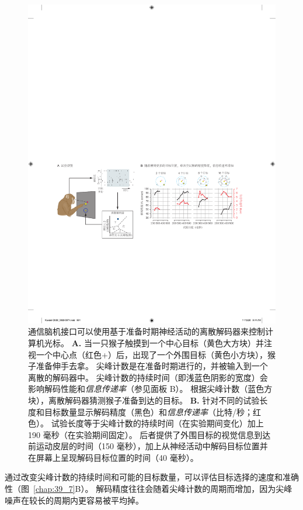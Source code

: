 \begin{figure}[htbp]
	\centering
	\includegraphics[width=1.0\linewidth]{chap39/fig_39_7}
	\caption{通信脑机接口可以使用基于准备时期神经活动的离散解码器来控制计算机光标。 
		\textbf{A.} 当一只猴子触摸到一个中心目标（黄色大方块）并注视一个中心点（红色+）后，出现了一个外围目标（黄色小方块），猴子准备伸手去拿。 
		尖峰计数是在准备时期进行的，并被输入到一个离散的解码器中。 
		尖峰计数的持续时间（即浅蓝色阴影的宽度）会影响解码性能和\textit{信息传递率}（参见面板 B）。 
		根据尖峰计数（蓝色方块），离散解码器猜测猴子准备到达的目标。 
		\textbf{B.} 针对不同的试验长度和目标数量显示解码精度（黑色）和\textit{信息传递率}（比特/秒；红色）。 
		试验长度等于尖峰计数的持续时间（在实验期间变化）加上 190 毫秒（在实验期间固定）。 
		后者提供了外围目标的视觉信息到达前运动皮层的时间（150 毫秒），加上从神经活动中解码目标位置并在屏幕上呈现解码目标位置的时间（40 毫秒）\cite{santhanam2006high}。}
	\label{fig:39_7}
\end{figure}


通过改变尖峰计数的持续时间和可能的目标数量，可以评估目标选择的速度和准确性（图~\ref{chap:39_7}B）。
解码精度往往会随着尖峰计数的周期而增加，因为尖峰噪声在较长的周期内更容易被平均掉。


